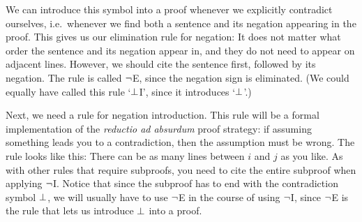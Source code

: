 We can introduce this symbol into a proof whenever we explicitly contradict ourselves, i.e.\ whenever we find both a sentence and its negation appearing in the proof.  This gives us our elimination rule for negation:
It does not matter what order the sentence and its negation appear in, and they do not need to appear on adjacent lines. However, we should cite the sentence first, followed by its negation. The rule is called $\neg$E, since the negation sign is eliminated. (We could equally have called this rule `$\bot$I', since it introduces `$\bot$'.)



Next, we need a rule for negation introduction. This rule will be a formal implementation of the \emph{reductio ad absurdum} proof strategy: if assuming something leads you to a contradiction, then the assumption must be wrong. The rule looks like this:
There can be as many lines between $i$ and $j$ as you like.  As with other rules that require subproofs, you need to cite the entire subproof when applying $\neg$I.  Notice that since the subproof has to end with the contradiction symbol $\bot$, we will usually have to use $\neg$E in the course of using $\neg$I, since $\neg$E is the rule that lets us introduce $\bot$ into a proof. 


